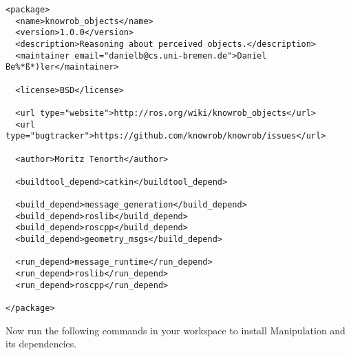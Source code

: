 \documentclass[main.tex]{subfiles}
\begin{document}
\begin{lstlisting}
<package>
  <name>knowrob_objects</name>
  <version>1.0.0</version>
  <description>Reasoning about perceived objects.</description>
  <maintainer email="danielb@cs.uni-bremen.de">Daniel Be%*ß*)ler</maintainer>

  <license>BSD</license>

  <url type="website">http://ros.org/wiki/knowrob_objects</url>
  <url type="bugtracker">https://github.com/knowrob/knowrob/issues</url>

  <author>Moritz Tenorth</author>

  <buildtool_depend>catkin</buildtool_depend>

  <build_depend>message_generation</build_depend>
  <build_depend>roslib</build_depend>
  <build_depend>roscpp</build_depend>
  <build_depend>geometry_msgs</build_depend>
  
  <run_depend>message_runtime</run_depend>
  <run_depend>roslib</run_depend>
  <run_depend>roscpp</run_depend>

</package>
\end{lstlisting}

Now run the following commands in your workspace to install Manipulation and its dependencies.\\	

\begin{mdframed}[backgroundcolor=mygray, rightline=false]

\end{mdframed}
	
	
\end{document}
